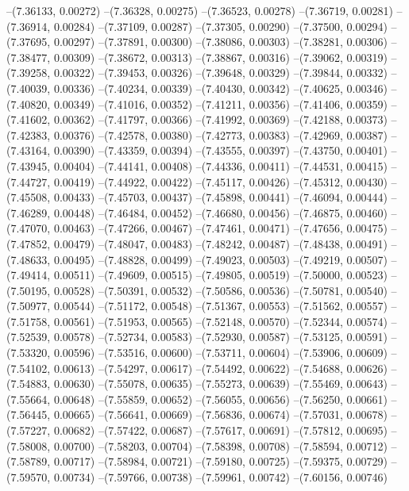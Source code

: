 --(7.36133, 0.00272)
--(7.36328, 0.00275)
--(7.36523, 0.00278)
--(7.36719, 0.00281)
--(7.36914, 0.00284)
--(7.37109, 0.00287)
--(7.37305, 0.00290)
--(7.37500, 0.00294)
--(7.37695, 0.00297)
--(7.37891, 0.00300)
--(7.38086, 0.00303)
--(7.38281, 0.00306)
--(7.38477, 0.00309)
--(7.38672, 0.00313)
--(7.38867, 0.00316)
--(7.39062, 0.00319)
--(7.39258, 0.00322)
--(7.39453, 0.00326)
--(7.39648, 0.00329)
--(7.39844, 0.00332)
--(7.40039, 0.00336)
--(7.40234, 0.00339)
--(7.40430, 0.00342)
--(7.40625, 0.00346)
--(7.40820, 0.00349)
--(7.41016, 0.00352)
--(7.41211, 0.00356)
--(7.41406, 0.00359)
--(7.41602, 0.00362)
--(7.41797, 0.00366)
--(7.41992, 0.00369)
--(7.42188, 0.00373)
--(7.42383, 0.00376)
--(7.42578, 0.00380)
--(7.42773, 0.00383)
--(7.42969, 0.00387)
--(7.43164, 0.00390)
--(7.43359, 0.00394)
--(7.43555, 0.00397)
--(7.43750, 0.00401)
--(7.43945, 0.00404)
--(7.44141, 0.00408)
--(7.44336, 0.00411)
--(7.44531, 0.00415)
--(7.44727, 0.00419)
--(7.44922, 0.00422)
--(7.45117, 0.00426)
--(7.45312, 0.00430)
--(7.45508, 0.00433)
--(7.45703, 0.00437)
--(7.45898, 0.00441)
--(7.46094, 0.00444)
--(7.46289, 0.00448)
--(7.46484, 0.00452)
--(7.46680, 0.00456)
--(7.46875, 0.00460)
--(7.47070, 0.00463)
--(7.47266, 0.00467)
--(7.47461, 0.00471)
--(7.47656, 0.00475)
--(7.47852, 0.00479)
--(7.48047, 0.00483)
--(7.48242, 0.00487)
--(7.48438, 0.00491)
--(7.48633, 0.00495)
--(7.48828, 0.00499)
--(7.49023, 0.00503)
--(7.49219, 0.00507)
--(7.49414, 0.00511)
--(7.49609, 0.00515)
--(7.49805, 0.00519)
--(7.50000, 0.00523)
--(7.50195, 0.00528)
--(7.50391, 0.00532)
--(7.50586, 0.00536)
--(7.50781, 0.00540)
--(7.50977, 0.00544)
--(7.51172, 0.00548)
--(7.51367, 0.00553)
--(7.51562, 0.00557)
--(7.51758, 0.00561)
--(7.51953, 0.00565)
--(7.52148, 0.00570)
--(7.52344, 0.00574)
--(7.52539, 0.00578)
--(7.52734, 0.00583)
--(7.52930, 0.00587)
--(7.53125, 0.00591)
--(7.53320, 0.00596)
--(7.53516, 0.00600)
--(7.53711, 0.00604)
--(7.53906, 0.00609)
--(7.54102, 0.00613)
--(7.54297, 0.00617)
--(7.54492, 0.00622)
--(7.54688, 0.00626)
--(7.54883, 0.00630)
--(7.55078, 0.00635)
--(7.55273, 0.00639)
--(7.55469, 0.00643)
--(7.55664, 0.00648)
--(7.55859, 0.00652)
--(7.56055, 0.00656)
--(7.56250, 0.00661)
--(7.56445, 0.00665)
--(7.56641, 0.00669)
--(7.56836, 0.00674)
--(7.57031, 0.00678)
--(7.57227, 0.00682)
--(7.57422, 0.00687)
--(7.57617, 0.00691)
--(7.57812, 0.00695)
--(7.58008, 0.00700)
--(7.58203, 0.00704)
--(7.58398, 0.00708)
--(7.58594, 0.00712)
--(7.58789, 0.00717)
--(7.58984, 0.00721)
--(7.59180, 0.00725)
--(7.59375, 0.00729)
--(7.59570, 0.00734)
--(7.59766, 0.00738)
--(7.59961, 0.00742)
--(7.60156, 0.00746)
